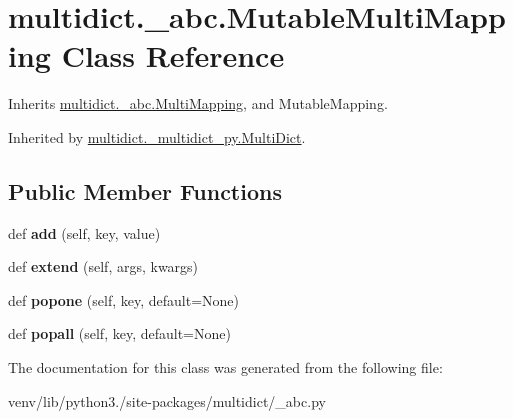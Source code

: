 \hypertarget{classmultidict_1_1__abc_1_1_mutable_multi_mapping}{}\section{multidict.\+\_\+abc.\+Mutable\+Multi\+Mapping Class Reference}
\label{classmultidict_1_1__abc_1_1_mutable_multi_mapping}


Inherits \hyperlink{classmultidict_1_1__abc_1_1_multi_mapping}{multidict.\+\_\+abc.\+Multi\+Mapping}, and Mutable\+Mapping.



Inherited by \hyperlink{classmultidict_1_1__multidict__py_1_1_multi_dict}{multidict.\+\_\+multidict\+\_\+py.\+Multi\+Dict}.

\subsection*{Public Member Functions}
\begin{DoxyCompactItemize}
\item 
\mbox{\label{classmultidict_1_1__abc_1_1_mutable_multi_mapping_ad5f3890431ff2cf630db1fd24324306b}} 
def {\bfseries add} (self, key, value)
\item 
\mbox{\label{classmultidict_1_1__abc_1_1_mutable_multi_mapping_ab3ffa920c2ce8a59f174cd5bbf218b82}} 
def {\bfseries extend} (self, args, kwargs)
\item 
\mbox{\label{classmultidict_1_1__abc_1_1_mutable_multi_mapping_aeb884e92adae1ace390f5df78130ad6f}} 
def {\bfseries popone} (self, key, default=None)
\item 
\mbox{\label{classmultidict_1_1__abc_1_1_mutable_multi_mapping_a1b0874c14d876e733e97ae7906c19e29}} 
def {\bfseries popall} (self, key, default=None)
\end{DoxyCompactItemize}


The documentation for this class was generated from the following file\+:\begin{DoxyCompactItemize}
\item 
venv/lib/python3./site-\/packages/multidict/\+\_\+abc.\+py\end{DoxyCompactItemize}
